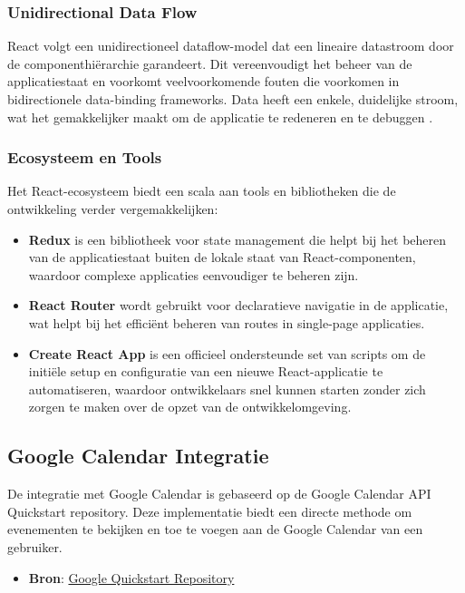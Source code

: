 \subsubsection{Unidirectional Data Flow}
React volgt een unidirectioneel dataflow-model dat een lineaire datastroom door de componenthiërarchie garandeert. Dit vereenvoudigt het beheer van de applicatiestaat en voorkomt veelvoorkomende fouten die voorkomen in bidirectionele data-binding frameworks. Data heeft een enkele, duidelijke stroom, wat het gemakkelijker maakt om de applicatie te redeneren en te debuggen \autocite{React2024}.

\subsubsection{Ecosysteem en Tools}
Het React-ecosysteem biedt een scala aan tools en bibliotheken die de ontwikkeling verder vergemakkelijken:
\begin{itemize}
    \item \textbf{Redux} is een bibliotheek voor state management die helpt bij het beheren van de applicatiestaat buiten de lokale staat van React-componenten, waardoor complexe applicaties eenvoudiger te beheren zijn.
    \item \textbf{React Router} wordt gebruikt voor declaratieve navigatie in de applicatie, wat helpt bij het efficiënt beheren van routes in single-page applicaties.
    \item \textbf{Create React App} is een officieel ondersteunde set van scripts om de initiële setup en configuratie van een nieuwe React-applicatie te automatiseren, waardoor ontwikkelaars snel kunnen starten zonder zich zorgen te maken over de opzet van de ontwikkelomgeving.
\end{itemize}

\subsection{Google Calendar Integratie}
De integratie met Google Calendar is gebaseerd op de Google Calendar API Quickstart repository. Deze implementatie biedt een directe methode om evenementen te bekijken en toe te voegen aan de Google Calendar van een gebruiker.
\begin{itemize}
    \item \textbf{Bron}: \href{https://github.com/googleworkspace/browser-samples/tree/main/calendar/quickstart}{Google Quickstart Repository}
\end{itemize}

